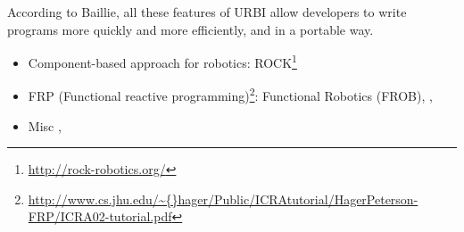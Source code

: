 According to Baillie, all these features of URBI allow developers to
write programs more quickly and more efficiently, and in a portable way.


\begin{itemize}
\item Component-based approach for robotics: 
  ROCK\footnote{\url{http://rock-robotics.org/}} \cite{Joyeux:2011fk}
\item FRP (Functional reactive
  programming)\footnote{\url{http://www.cs.jhu.edu/\~{}hager/Public/ICRAtutorial/HagerPeterson-FRP/ICRA02-tutorial.pdf}}:
  Functional Robotics (FROB)\cite{Hager:1999fk},
  \cite{Peterson:1999lk}, \cite{Pembeci:2002fc}
\item Misc \cite{Thiry:2008ys}, \cite{Proetzsch:2010vn}
\end{itemize}


